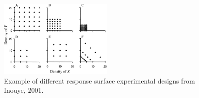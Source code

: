 \documentclass{article}\usepackage[]{graphicx}\usepackage[]{color}
\begin{document}
\begin{figure}[here]
\begin{center}
\includegraphics[width=0.5\textwidth]{..//figures/response_surface.jpg}
\caption{Example of different response surface experimental designs from Inouye, 2001.}
\label{fig:Figure 7}
\end{center}
\end{figure}
\end{document}
